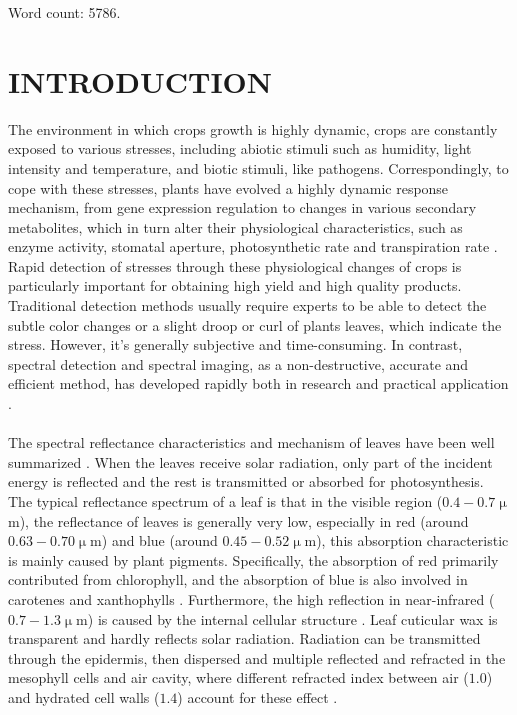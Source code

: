 \documentclass[12pt,a4paper]{article}
\begin{document}
\begin{flushleft} 
\vspace{3cm}
Word count: 5786.
\newpage
\end{flushleft}


\newpage
\tableofcontents

\newpage
\section{INTRODUCTION}
The environment in which crops growth is highly dynamic, crops are constantly exposed to various stresses, including abiotic stimuli such as humidity, light intensity and temperature, and biotic stimuli, like pathogens. Correspondingly, to cope with these stresses, plants have evolved a highly dynamic response mechanism, from gene expression regulation to changes in various secondary metabolites, which in turn alter their physiological characteristics, such as enzyme activity, stomatal aperture, photosynthetic rate and transpiration rate \citep{carter1993responses}. Rapid detection of stresses through these physiological changes of crops is particularly important for obtaining high yield and high quality products. Traditional detection methods usually require experts to be able to detect the subtle color changes or a slight droop or curl of plants leaves, which indicate the stress. However, it's generally subjective and time-consuming. In contrast, spectral detection and spectral imaging, as a non-destructive, accurate and efficient method, has developed rapidly both in research and practical application \citep{xue2017significant}. 
\\
\\
The spectral reflectance characteristics and mechanism of leaves have been well summarized \citep{knipling1970physical, gates1965spectral}. When the leaves receive solar radiation, only part of the incident energy is reflected and the rest is transmitted or absorbed for photosynthesis. The typical reflectance spectrum of a leaf is that in the visible region ($0.4-0.7 \upmu$m), the reflectance of leaves is generally very low, especially in red (around $0.63-0.70 \upmu$m) and blue (around $0.45-0.52 \upmu$m), this absorption characteristic is mainly caused by plant pigments. Specifically, the absorption of red primarily contributed from chlorophyll, and the absorption of blue is also involved in carotenes and xanthophylls \citep{gates1965spectral,Rabideau1946THEAA}. Furthermore, the high reflection in near-infrared ($0.7-1.3 \upmu$m) is caused by the internal cellular structure \citep{Mestre1935The,willstatter1907untersuchungen}. Leaf cuticular wax is transparent and hardly reflects solar radiation. Radiation can be transmitted through the epidermis, then dispersed and multiple reflected and refracted in the mesophyll cells and air cavity, where different refracted index between air ($1.0$) and hydrated cell walls ($1.4$) account for these effect \citep{sinclair1968pathway}. 
\end{document}
